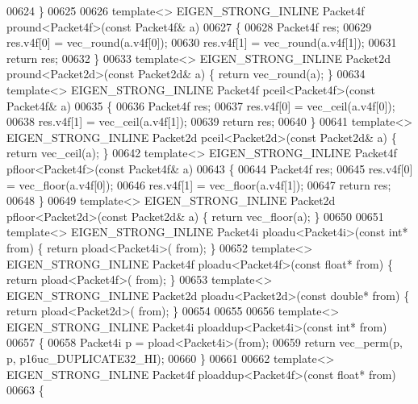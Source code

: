 \begin{DoxyCode}
{00624 \}
00625 
00626 \textcolor{keyword}{template}<> EIGEN\_STRONG\_INLINE Packet4f pround<Packet4f>(\textcolor{keyword}{const} Packet4f& a)
00627 \{
00628   Packet4f res;
00629   res.v4f[0] = vec\_round(a.v4f[0]);
00630   res.v4f[1] = vec\_round(a.v4f[1]);
00631   \textcolor{keywordflow}{return} res;
00632 \}
00633 \textcolor{keyword}{template}<> EIGEN\_STRONG\_INLINE Packet2d pround<Packet2d>(\textcolor{keyword}{const} Packet2d& a) \{ \textcolor{keywordflow}{return} vec\_round(a); \}
00634 \textcolor{keyword}{template}<> EIGEN\_STRONG\_INLINE Packet4f pceil<Packet4f>(\textcolor{keyword}{const}  Packet4f& a)
00635 \{
00636   Packet4f res;
00637   res.v4f[0] = vec\_ceil(a.v4f[0]);
00638   res.v4f[1] = vec\_ceil(a.v4f[1]);
00639   \textcolor{keywordflow}{return} res;
00640 \}
00641 \textcolor{keyword}{template}<> EIGEN\_STRONG\_INLINE Packet2d pceil<Packet2d>(\textcolor{keyword}{const}  Packet2d& a) \{ \textcolor{keywordflow}{return} vec\_ceil(a); \}
00642 \textcolor{keyword}{template}<> EIGEN\_STRONG\_INLINE Packet4f pfloor<Packet4f>(\textcolor{keyword}{const} Packet4f& a)
00643 \{
00644   Packet4f res;
00645   res.v4f[0] = vec\_floor(a.v4f[0]);
00646   res.v4f[1] = vec\_floor(a.v4f[1]);
00647   \textcolor{keywordflow}{return} res;
00648 \}
00649 \textcolor{keyword}{template}<> EIGEN\_STRONG\_INLINE Packet2d pfloor<Packet2d>(\textcolor{keyword}{const} Packet2d& a) \{ \textcolor{keywordflow}{return} vec\_floor(a); \}
00650 
00651 \textcolor{keyword}{template}<> EIGEN\_STRONG\_INLINE Packet4i ploadu<Packet4i>(\textcolor{keyword}{const} \textcolor{keywordtype}{int}*       from) \{ \textcolor{keywordflow}{return} pload<Packet4i>(
      from); \}
00652 \textcolor{keyword}{template}<> EIGEN\_STRONG\_INLINE Packet4f ploadu<Packet4f>(\textcolor{keyword}{const} \textcolor{keywordtype}{float}*     from) \{ \textcolor{keywordflow}{return} pload<Packet4f>(
      from); \}
00653 \textcolor{keyword}{template}<> EIGEN\_STRONG\_INLINE Packet2d ploadu<Packet2d>(\textcolor{keyword}{const} \textcolor{keywordtype}{double}*    from) \{ \textcolor{keywordflow}{return} pload<Packet2d>(
      from); \}
00654 
00655 
00656 \textcolor{keyword}{template}<> EIGEN\_STRONG\_INLINE Packet4i ploaddup<Packet4i>(\textcolor{keyword}{const} \textcolor{keywordtype}{int}*     from)
00657 \{
00658   Packet4i p = pload<Packet4i>(from);
00659   \textcolor{keywordflow}{return} vec\_perm(p, p, p16uc\_DUPLICATE32\_HI);
00660 \}
00661 
00662 \textcolor{keyword}{template}<> EIGEN\_STRONG\_INLINE Packet4f ploaddup<Packet4f>(\textcolor{keyword}{const} \textcolor{keywordtype}{float}*    from)
00663 \{
}
\end{DoxyCode}
